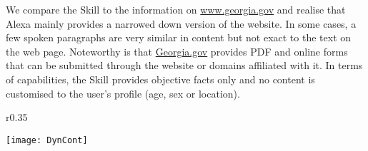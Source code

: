 %
\begin{flushright}
\end{flushright}






We compare the Skill to the information on \url{www.georgia.gov} and realise that Alexa mainly provides a narrowed down version of the website. In some cases, a few spoken paragraphs are very similar in content but not exact to the text on the web page. Noteworthy is that \href{www.georgia.gov}{Georgia.gov} provides PDF and online forms that can be submitted through the website or domains affiliated with it. In terms of capabilities, the Skill provides objective facts only and no content is customised to the user's profile (age, sex or location). 

\begin{wrapfigure}{r}{0.35\textwidth}
	\begin{center}
		\texttt{[image: DynCont]}
	\end{center}
\end{wrapfigure}


